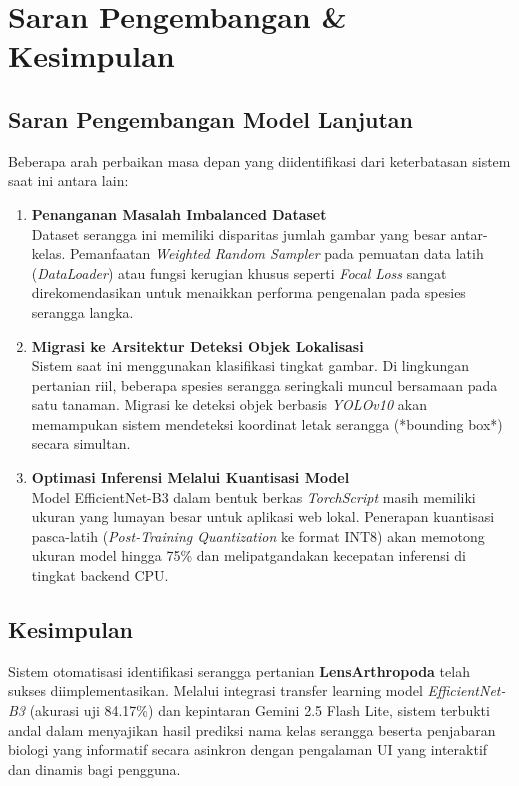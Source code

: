 \documentclass[12pt, a4paper]{article}
\begin{document}
\newpage
\section{Saran Pengembangan & Kesimpulan}

\subsection{Saran Pengembangan Model Lanjutan}
Beberapa arah perbaikan masa depan yang diidentifikasi dari keterbatasan sistem saat ini antara lain:
\begin{enumerate}
    \item \textbf{Penanganan Masalah Imbalanced Dataset} \\
    Dataset serangga ini memiliki disparitas jumlah gambar yang besar antar-kelas. Pemanfaatan \textit{Weighted Random Sampler} pada pemuatan data latih (\textit{DataLoader}) atau fungsi kerugian khusus seperti \textit{Focal Loss} sangat direkomendasikan untuk menaikkan performa pengenalan pada spesies serangga langka.
    
    \item \textbf{Migrasi ke Arsitektur Deteksi Objek Lokalisasi} \\
    Sistem saat ini menggunakan klasifikasi tingkat gambar. Di lingkungan pertanian riil, beberapa spesies serangga seringkali muncul bersamaan pada satu tanaman. Migrasi ke deteksi objek berbasis \textit{YOLOv10} akan memampukan sistem mendeteksi koordinat letak serangga (*bounding box*) secara simultan.
    
    \item \textbf{Optimasi Inferensi Melalui Kuantisasi Model} \\
    Model EfficientNet-B3 dalam bentuk berkas \textit{TorchScript} masih memiliki ukuran yang lumayan besar untuk aplikasi web lokal. Penerapan kuantisasi pasca-latih (\textit{Post-Training Quantization} ke format INT8) akan memotong ukuran model hingga 75\% dan melipatgandakan kecepatan inferensi di tingkat backend CPU.
\end{enumerate}

\subsection{Kesimpulan}
Sistem otomatisasi identifikasi serangga pertanian \textbf{LensArthropoda} telah sukses diimplementasikan. Melalui integrasi transfer learning model \textit{EfficientNet-B3} (akurasi uji 84.17\%) dan kepintaran Gemini 2.5 Flash Lite, sistem terbukti andal dalam menyajikan hasil prediksi nama kelas serangga beserta penjabaran biologi yang informatif secara asinkron dengan pengalaman UI yang interaktif dan dinamis bagi pengguna.
\end{document}
